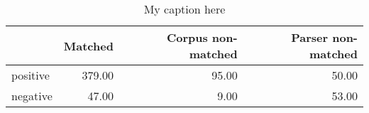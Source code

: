 \begin{table}[!ht]
\centering
\begin{tabular}{lrrr}
\toprule
{} &  Matched &  Corpus non-matched &  Parser non-matched \\
\midrule
positive &   379.00 &               95.00 &               50.00 \\
negative &    47.00 &                9.00 &               53.00 \\
\bottomrule
\end{tabular}
\caption{My caption here}
\label{tab:POLARITY-ocd-data}
\end{table}